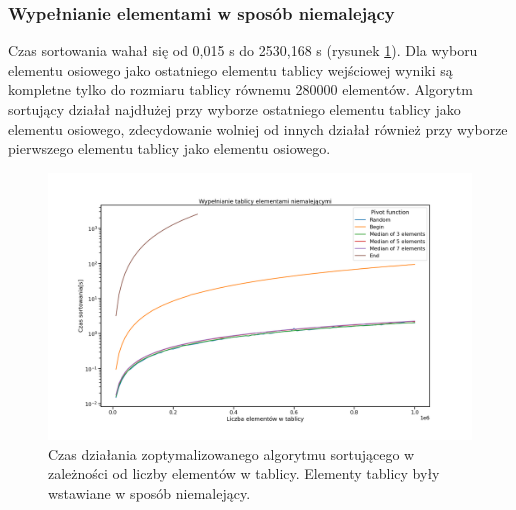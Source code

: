 \documentclass{article}
\begin{document}
        \subsubsection{Wypełnianie elementami w sposób niemalejący}
        Czas sortowania wahał się od 0,015 s do 2530,168 s (rysunek \ref{fig:optimized:nondecreasing_fill}). Dla wyboru elementu osiowego jako ostatniego elementu tablicy wejściowej wyniki są kompletne tylko do rozmiaru tablicy równemu 280000 elementów. Algorytm sortujący działał najdłużej przy wyborze ostatniego elementu tablicy jako elementu osiowego, zdecydowanie wolniej od innych działał również przy wyborze pierwszego elementu tablicy jako elementu osiowego.
        \begin{figure}
            \centering
            \includegraphics[width=\textwidth]{ryciny/optymalizacje/lineplot-nondecreasing-fill-log-scale.png}
            \caption{Czas działania zoptymalizowanego algorytmu sortującego w zależności od liczby elementów w tablicy. Elementy tablicy były wstawiane w sposób niemalejący.}
            \label{fig:optimized:nondecreasing_fill}
        \end{figure}
    
\end{document}
